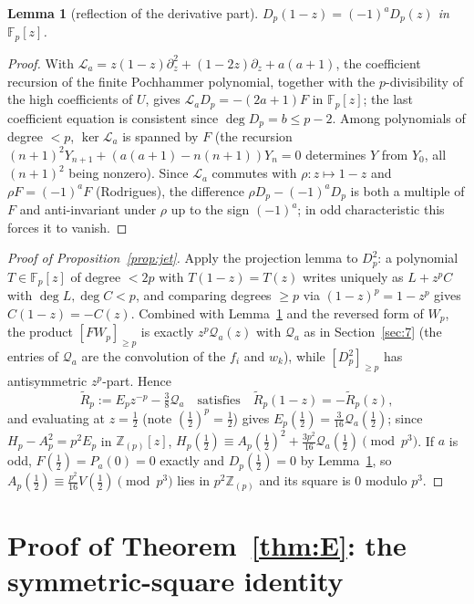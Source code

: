 \documentclass[11pt]{amsart}
\newtheorem{lemma}[theorem]{Lemma}
\theoremstyle{definition}
\theoremstyle{remark}
\newcommand{\Fp}{\mathbb{F}_p}
\newcommand{\Zp}{\mathbb{Z}_{(p)}}
\begin{document}
\begin{lemma}[reflection of the derivative part]\label{lem:B4}
$D_p(1-z)=(-1)^aD_p(z)$ in $\Fp[z]$.
\end{lemma}

\begin{proof}
With $\mathcal L_a=z(1-z)\partial_z^2+(1-2z)\partial_z+a(a+1)$, the
coefficient recursion of the finite Pochhammer polynomial, together with
the $p$-divisibility of the high coefficients of $U$, gives
$\mathcal L_aD_p=-(2a+1)F$ in $\Fp[z]$; the last coefficient equation
is consistent since $\deg D_p=b\le p-2$. Among polynomials of degree
$<p$, $\ker\mathcal L_a$ is spanned by $F$ (the recursion
$(n+1)^2Y_{n+1}+(a(a+1)-n(n+1))Y_n=0$ determines $Y$ from $Y_0$, all
$(n+1)^2$ being nonzero). Since $\mathcal L_a$ commutes with
$\rho:z\mapsto1-z$ and $\rho F=(-1)^aF$ (Rodrigues), the difference
$\rho D_p-(-1)^aD_p$ is both a multiple of $F$ and anti-invariant under
$\rho$ up to the sign $(-1)^a$; in odd characteristic this forces it to
vanish.
\end{proof}

\begin{proof}[Proof of Proposition~\ref{prop:jet}]
Apply the projection lemma to $D_p^2$: a polynomial
$T\in\Fp[z]$ of degree $<2p$ with $T(1-z)=T(z)$ writes uniquely as
$L+z^pC$ with $\deg L,\deg C<p$, and comparing degrees $\ge p$ via
$(1-z)^p=1-z^p$ gives $C(1-z)=-C(z)$. Combined with Lemma~\ref{lem:B4}
and the reversed form of $W_p$, the product $[FW_p]_{\ge p}$ is exactly
$z^p\mathcal Q_a(z)$ with $\mathcal Q_a$ as in Section~\ref{sec:7}
(the entries of $\mathcal Q_a$ are the convolution of the $f_i$ and
$w_k$), while $[D_p^2]_{\ge p}$ has antisymmetric $z^p$-part. Hence
\[
\widetilde R_p:=E_p z^{-p}-\tfrac38\mathcal Q_a
\quad\text{satisfies}\quad
\widetilde R_p(1-z)=-\widetilde R_p(z),
\]
and evaluating at $z=\frac12$ (note $(\frac12)^p=\frac12$) gives
$E_p(\frac12)=\frac3{16}\mathcal Q_a(\frac12)$; since
$H_p-A_p^2=p^2E_p$ in $\Zp[z]$,
$H_p(\frac12)\equiv A_p(\frac12)^2+\frac{3p^2}{16}\mathcal
Q_a(\frac12)\pmod{p^3}$.
If $a$ is odd, $F(\frac12)=P_a(0)=0$ exactly and
$D_p(\frac12)=0$ by Lemma~\ref{lem:B4}, so
$A_p(\frac12)\equiv\frac{p^2}{16}V(\frac12)\pmod{p^3}$ lies in
$p^2\Zp$ and its square is $0$ modulo $p^3$.
\end{proof}

\section{Proof of Theorem~\ref{thm:E}: the symmetric-square
identity}\label{app:C}
\end{document}
